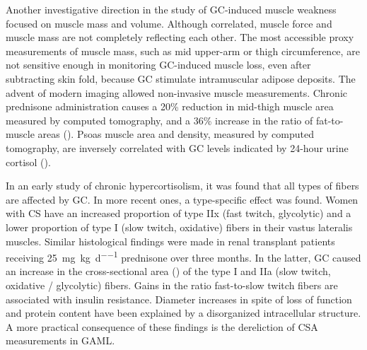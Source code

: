 \documentclass[12pt,english]{report}\usepackage[]{graphicx}\usepackage[]{color}
\begin{document}
Another investigative direction in the study of GC-induced muscle
weakness focused on muscle mass and volume. Although correlated, muscle
force and muscle mass are not completely reflecting each other. The
most accessible proxy measurements of muscle mass, such as mid upper-arm
or thigh circumference, are not sensitive enough in monitoring GC-induced
muscle loss, even after subtracting skin fold, because GC stimulate
intramuscular adipose deposits\citep{horber1987impact}. The advent
of modern imaging allowed non-invasive muscle measurements. Chronic
prednisone administration causes a 20\% reduction in mid-thigh muscle
area measured by computed tomography, and a 36\% increase in the ratio
of fat-to-muscle areas ()\citep{horber1985evidence}.
Psoas muscle area and density, measured by computed tomography, are
inversely correlated with GC levels indicated by 24-hour urine cortisol
()\citep{miller2011quantitative}.

In an early study of chronic hypercortisolism, it was found that all
types of fibers are affected by GC\citep{khaleeli1983corticosteroid}.
In more recent ones, a type-specific effect was found. Women with
CS have an increased proportion of type IIx (fast twitch, glycolytic)
and a lower proportion of type I (slow twitch, oxidative) fibers in
their vastus lateralis muscles\citep{rebuffe-scrive1988muscle}. Similar
histological findings were made in renal transplant patients receiving
\SI{25}{\milli\gram\per\kilo\gram\per\day} prednisone over three
months\citep{topp2003alterations}. In the latter, GC caused an increase
in the cross-sectional area ()
of the type I and IIa (slow twitch, oxidative / glycolytic) fibers.
Gains in the ratio fast-to-slow twitch fibers are associated with
insulin resistance\citep{simoneau1995skeletal}. Diameter increases
in spite of loss of function and protein content have been explained
by a disorganized intracellular structure. A more practical consequence
of these findings is the dereliction of CSA measurements in GAML. 
\end{document}
